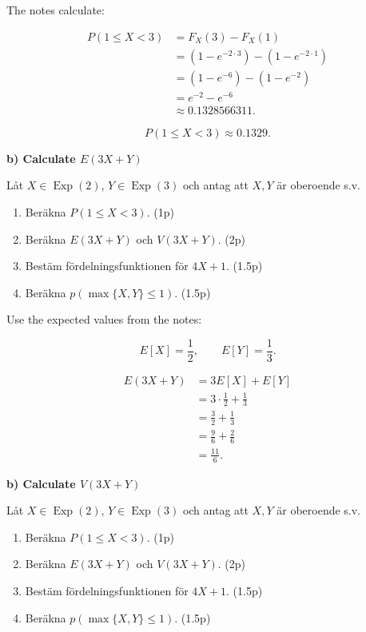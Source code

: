 \documentclass[10pt]{article}
\begin{document}
The notes calculate:

\begin{align*}
P(1\leq X<3)
&=F_X(3)-F_X(1) \\[2mm]
&=(1-e^{-2\cdot 3})
 -(1-e^{-2\cdot 1}) \\[2mm]
&=(1-e^{-6})-(1-e^{-2}) \\[2mm]
&=e^{-2}-e^{-6} \\[2mm]
&\approx 0.1328566311.
\end{align*}

\[
P(1\leq X<3)
\approx 0.1329.
\]

\textbf{b) Calculate \(E(3X+Y)\)}

Låt \(X \in \operatorname{Exp}(2)\),
\(Y \in \operatorname{Exp}(3)\) och antag att
\(X, Y\) är oberoende s.v.

\begin{enumerate}[label=\alph*)]
\item Beräkna \(P(1 \leq X < 3)\). \hfill (1p)
\item Beräkna \(E(3X+Y)\) och \(V(3X+Y)\). \hfill (2p)
\item Bestäm fördelningsfunktionen för \(4X+1\). \hfill (1.5p)
\item Beräkna \(p(\max\{X,Y\}\leq 1)\). \hfill (1.5p)
\end{enumerate}

Use the expected values from the notes:

\[
E[X]=\frac{1}{2},
\qquad
E[Y]=\frac{1}{3}.
\]

\begin{align*}
E(3X+Y)
&=3E[X]+E[Y] \\[2mm]
&=3\cdot \frac{1}{2}
  +\frac{1}{3} \\[2mm]
&=\frac{3}{2}+\frac{1}{3} \\[2mm]
&=\frac{9}{6}+\frac{2}{6} \\[2mm]
&=\frac{11}{6}.
\end{align*}

\textbf{b) Calculate \(V(3X+Y)\)}

Låt \(X \in \operatorname{Exp}(2)\),
\(Y \in \operatorname{Exp}(3)\) och antag att
\(X, Y\) är oberoende s.v.

\begin{enumerate}[label=\alph*)]
\item Beräkna \(P(1 \leq X < 3)\). \hfill (1p)
\item Beräkna \(E(3X+Y)\) och \(V(3X+Y)\). \hfill (2p)
\item Bestäm fördelningsfunktionen för \(4X+1\). \hfill (1.5p)
\item Beräkna \(p(\max\{X,Y\}\leq 1)\). \hfill (1.5p)
\end{enumerate}
\end{document}
